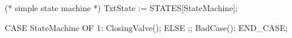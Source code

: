 (* simple state machine *)
TxtState := STATES[StateMachine];
 
CASE StateMachine OF
   1: ClosingValve();
ELSE
    ;; BadCase();
END_CASE;